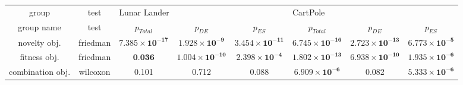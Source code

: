 \begin{tabular}{cc|ccc|ccc}
\toprule
           group &     test & \multicolumn{3}{l}{Lunar Lander} & \multicolumn{3}{l}{CartPole} \\
      group name &     test &                      $p_{Total}$ &                         $p_{DE}$ &                         $p_{ES}$ &                      $p_{Total}$ &                         $p_{DE}$ &                        $p_{ES}$ \\
\midrule
    novelty obj. & friedman & $\mathbf{7.385 \times 10^{-17}}$ &  $\mathbf{1.928 \times 10^{-9}}$ & $\mathbf{3.454 \times 10^{-11}}$ & $\mathbf{6.745 \times 10^{-16}}$ & $\mathbf{2.723 \times 10^{-13}}$ & $\mathbf{6.773 \times 10^{-5}}$ \\
    fitness obj. & friedman &                 $\textbf{0.036}$ & $\mathbf{1.004 \times 10^{-10}}$ &  $\mathbf{2.398 \times 10^{-4}}$ & $\mathbf{1.802 \times 10^{-13}}$ & $\mathbf{6.938 \times 10^{-10}}$ & $\mathbf{1.935 \times 10^{-6}}$ \\
combination obj. & wilcoxon &                            0.101 &                            0.712 &                            0.088 &  $\mathbf{6.909 \times 10^{-6}}$ &                            0.082 & $\mathbf{5.333 \times 10^{-6}}$ \\
\bottomrule
\end{tabular}
